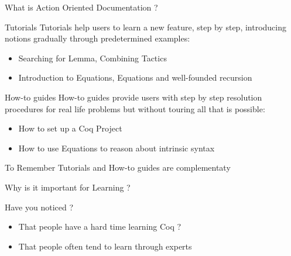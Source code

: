 \documentclass[10pt]{beamer}
\begin{document}
\begin{frame}{What is Action Oriented Documentation ?}
  \vspace*{-4pt}
  \begin{tcbProp}{Tutorials}
    Tutorials help users to learn a new feature, step by step, introducing
    notions gradually through predetermined examples:
    \begin{itemize}[label=$-$]
      \item<2-> Searching for Lemma, Combining Tactics
      \item<2-> Introduction to Equations, Equations and well-founded recursion
    \end{itemize}
  \end{tcbProp}
  \vspace*{-4pt}
  \begin{tcbProp}{How-to guides}
    How-to guides provide users with step by step resolution procedures for real
    life problems but without touring all that is possible:
    \begin{itemize}[label=$-$]
      \item<4-> How to set up a Coq Project
      \item<4-> How to use Equations to reason about intrinsic syntax
    \end{itemize}
  \end{tcbProp}
  \vspace*{-4pt}
  \begin{tcbSol}{To Remember}
    Tutorials and How-to guides are complementaty
  \end{tcbSol}
\end{frame}

\begin{frame}{Why is it important for Learning ?}
  \begin{tcbPbl}{Have you noticed ?}
    \begin{itemize}
      \item That people have a hard time learning Coq ?
      \item That people often tend to learn through experts
    \end{itemize}
  \end{tcbPbl}

\end{frame}
\end{document}
